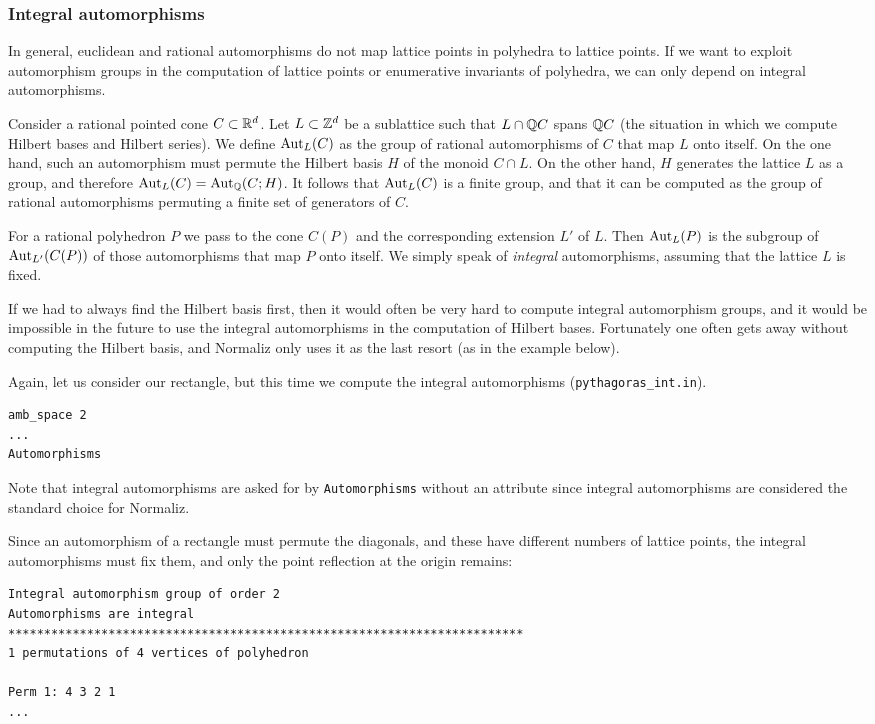 \subsubsection{Integral automorphisms}

In general, euclidean and rational automorphisms do not map lattice points in polyhedra to lattice points. If we want to exploit automorphism groups in the computation of lattice points or enumerative invariants of polyhedra, we can only depend on integral automorphisms.

Consider a rational pointed cone $C\subset{\mathbb R}^d$. Let $L\subset{\mathbb Z}^d$ be a sublattice such that $L\cap {\mathbb Q} C$ spans ${\mathbb Q} C$ (the situation in which we compute Hilbert bases and Hilbert series). We define $\operatorname{Aut}_L(C)$ as the group of rational automorphisms of $C$ that map $L$ onto itself. On the one hand, such an automorphism must permute the Hilbert basis $H$ of the monoid $C\cap L$. On the other hand, $H$ generates the lattice $L$ as a group, and therefore $\operatorname{Aut}_L(C)=\operatorname{Aut}_{\mathbb Q}(C;H)$. It follows that $\operatorname{Aut}_L(C)$ is a finite group, and that it can be computed as the group of rational automorphisms permuting a finite set of generators of $C$.

For a rational polyhedron $P$ we pass to the cone $C(P)$ and the corresponding extension $L'$ of $L$. Then $\operatorname{Aut}_L(P)$ is the subgroup of $\operatorname{Aut}_{L'}(C(P))$ of those automorphisms that map $P$ onto itself. We simply speak of \emph{integral} automorphisms, assuming that the lattice $L$ is fixed.

If we had to always find the Hilbert basis first, then it would often be very hard to compute integral automorphism groups, and it would be impossible in the future to use the integral automorphisms in the computation of Hilbert bases. Fortunately one often gets away without computing the Hilbert basis, and Normaliz only uses it as the last resort (as in the example below).

Again, let us consider our rectangle, but this time we compute the integral automorphisms (\verb|pythagoras_int.in|).
\begin{Verbatim}
amb_space 2
...
Automorphisms
\end{Verbatim}
Note that integral automorphisms are asked for by \verb|Automorphisms| without an attribute since integral automorphisms are considered the standard choice for Normaliz.

Since an automorphism of a rectangle must permute the diagonals, and these have different numbers of lattice points, the integral automorphisms must fix them, and only the point reflection at the origin remains:
\begin{Verbatim}
Integral automorphism group of order 2
Automorphisms are integral
************************************************************************
1 permutations of 4 vertices of polyhedron

Perm 1: 4 3 2 1
...
\end{Verbatim}

